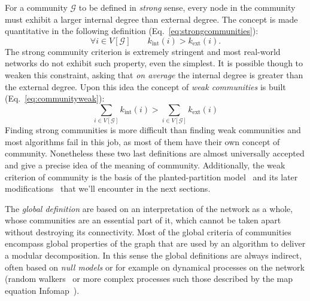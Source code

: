 For a community $\mathcal{G}$ to be defined in \emph{strong} sense, every node in the community must exhibit a larger internal degree than external degree.
The concept is made quantitative in the following definition (Eq.~\ref{eq:strongcommunities}):
\begin{equation}\label{eq:strongcommunities}
\forall i \in V[ \mathcal{G} ] \qquad k_{\textrm{int}}(i) > k_{\textrm{ext}}(i).
\end{equation}
The strong community criterion is extremely stringent and most real-world networks do not exhibit such property, even the simplest.
It is possible though to weaken this constraint, asking that \emph{on average} the internal degree is greater than the external degree.
 Upon this idea the concept of \emph{weak communities} is built (Eq.~\ref{eq:communityweak}):
\begin{equation}\label{eq:communityweak}
\sum \limits_{i \in V[\mathcal{G}]} k_{\textrm{int}}(i) > \sum \limits_{i \in V[\mathcal{G}]} k_{\textrm{ext}}(i)
\end{equation}
Finding strong communities is more difficult than finding weak communities and most algorithms fail in this job, as most of them have their own concept of community.
Nonetheless these two last definitions are almost universally accepted and give a precise idea of the meaning of community.
Additionally, the weak criterion of community is the basis of the planted-partition model~\cite{condon2000} and its later modifications~\cite{lancichinetti2008} that we'll encounter in the next sections.


The \emph{global definition} are based on an interpretation of the network as a whole, whose communities are an essential part of it, which cannot be taken apart without destroying its connectivity.
Most of the global criteria of communities encompass global properties of the graph that are used by an algorithm to deliver a modular decomposition.
In this sense the global definitions are always indirect, often based on \emph{null models} or for example on dynamical processes on the network (random walkers~\cite{pons2006} or more complex processes such those described by the map equation Infomap~\cite{rosvall2008}).

